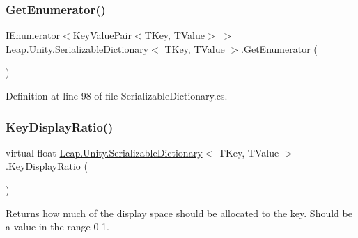 \mbox{\label{class_leap_1_1_unity_1_1_serializable_dictionary_ad6975ce8fcf734f94863e9fda5506ccb}} 
\subsubsection{\texorpdfstring{GetEnumerator()}{GetEnumerator()}}
{\footnotesize\ttfamily I\+Enumerator$<$Key\+Value\+Pair$<$T\+Key, T\+Value$>$ $>$ \mbox{\hyperlink{class_leap_1_1_unity_1_1_serializable_dictionary}{Leap.\+Unity.\+Serializable\+Dictionary}}$<$ T\+Key, T\+Value $>$.Get\+Enumerator (\begin{DoxyParamCaption}{ }\end{DoxyParamCaption})}



Definition at line 98 of file Serializable\+Dictionary.\+cs.

\mbox{\label{class_leap_1_1_unity_1_1_serializable_dictionary_a237caec5f2755f82e24f0eedf9005968}} 
\subsubsection{\texorpdfstring{KeyDisplayRatio()}{KeyDisplayRatio()}}
{\footnotesize\ttfamily virtual float \mbox{\hyperlink{class_leap_1_1_unity_1_1_serializable_dictionary}{Leap.\+Unity.\+Serializable\+Dictionary}}$<$ T\+Key, T\+Value $>$.Key\+Display\+Ratio (\begin{DoxyParamCaption}{ }\end{DoxyParamCaption})\hspace{0.3cm}{\ttfamily [virtual]}}



Returns how much of the display space should be allocated to the key. Should be a value in the range 0-\/1. 



